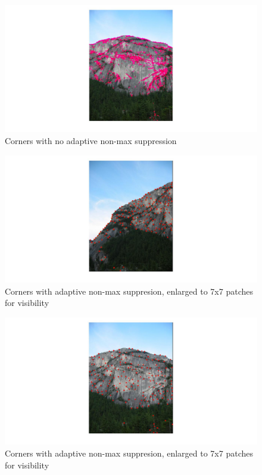 \documentclass[english]{article}
\begin{document}
      \begin{figure}[h!]
          \includegraphics[width=1\textwidth]{nonanms2}
          \caption{Corners with no adaptive non-max suppression}
          \label{fig:test1}
        \end{figure} 
        
\begin{figure}[h!]
    \includegraphics[width=1\textwidth]{anms1}
    \caption{Corners with adaptive non-max suppresion, enlarged to 7x7 patches for visibility}
    \label{fig:test1}
  \end{figure}
  
  \begin{figure}[h!]
      \includegraphics[width=1\textwidth]{anms2}
      \caption{Corners with adaptive non-max suppresion, enlarged to 7x7 patches for visibility}
      \label{fig:test1}
    \end{figure}
    
\end{document}
